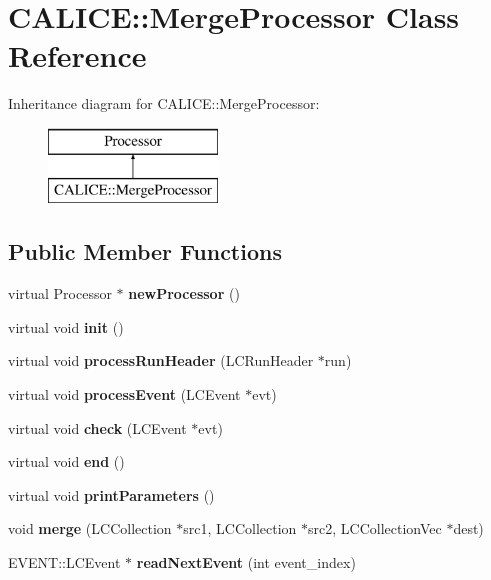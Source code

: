 \section{C\-A\-L\-I\-C\-E\-:\-:Merge\-Processor Class Reference}
\label{classCALICE_1_1MergeProcessor}
Inheritance diagram for C\-A\-L\-I\-C\-E\-:\-:Merge\-Processor\-:\begin{figure}[H]
\begin{center}
\leavevmode
\includegraphics[height=2.000000cm]{classCALICE_1_1MergeProcessor}
\end{center}
\end{figure}
\subsection*{Public Member Functions}
\begin{DoxyCompactItemize}
\item 
virtual Processor $\ast$ {\bfseries new\-Processor} ()\label{classCALICE_1_1MergeProcessor_a80588425ec0fc5d6c87eca2d5ef1f693}

\item 
virtual void {\bfseries init} ()\label{classCALICE_1_1MergeProcessor_a142cbdd317425b544d49c7daab3005b6}

\item 
virtual void {\bfseries process\-Run\-Header} (L\-C\-Run\-Header $\ast$run)\label{classCALICE_1_1MergeProcessor_ab35dbd0a58ed6d768e065f0919ce018f}

\item 
virtual void {\bfseries process\-Event} (L\-C\-Event $\ast$evt)\label{classCALICE_1_1MergeProcessor_ac52a52d3a922ce38868484703100d3b1}

\item 
virtual void {\bfseries check} (L\-C\-Event $\ast$evt)\label{classCALICE_1_1MergeProcessor_a7179f7f6f3cca70b3653b995eb8db37e}

\item 
virtual void {\bfseries end} ()\label{classCALICE_1_1MergeProcessor_ab76fdd20121a0d13ec7b634b17b17734}

\item 
virtual void {\bfseries print\-Parameters} ()\label{classCALICE_1_1MergeProcessor_a8320e519ba63d6f1f61f24cb0f64ea97}

\item 
void {\bfseries merge} (L\-C\-Collection $\ast$src1, L\-C\-Collection $\ast$src2, L\-C\-Collection\-Vec $\ast$dest)\label{classCALICE_1_1MergeProcessor_a5981b1d2303251571a0b18d4a9842c21}

\item 
E\-V\-E\-N\-T\-::\-L\-C\-Event $\ast$ {\bfseries read\-Next\-Event} (int event\-\_\-index)\label{classCALICE_1_1MergeProcessor_a781da33661648256a664cacb9db5fe1d}

\end{DoxyCompactItemize}


